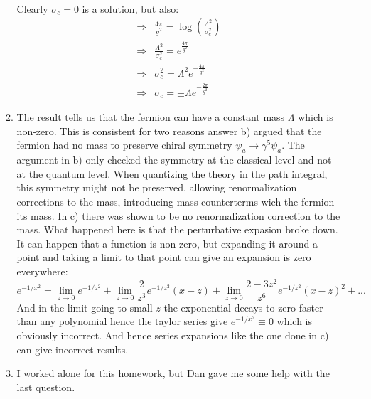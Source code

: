 \documentclass[12pt,a4]{article}
\begin{document}
\begin{enumerate}
\begin{enumerate}
\begin{align*}
        \end{align*}
        Clearly $\sigma_c = 0$ is a solution, but also:
        \begin{align*}
          \Rightarrow & \frac{4 \pi}{g^2} = \log\left(\frac{\Lambda^2}{\sigma^2_c}\right)\\
          \Rightarrow & \frac{\Lambda^2}{\sigma^2_c} = e^{\frac{4 \pi}{g^2}}\\
          \Rightarrow & \sigma^2_c = \Lambda^2 e^{- \frac{4 \pi}{g^2}}\\
          \Rightarrow & \sigma_c = \pm \Lambda e^{- \frac{2 \pi}{g^2}}
        \end{align*}
      \item
        The result tells us that the fermion can have a constant mass $\Lambda$ which is non-zero.
        This is consistent for two reasons answer b) argued that the fermion had no mass to preserve chiral symmetry $\psi_a \to \gamma^5\psi_a$.
        The argument in b) only checked the symmetry at the classical level and not at the quantum level.
        When quantizing the theory in the path integral, this symmetry might not be preserved, allowing renormalization corrections to the mass, introducing mass counterterms wich the fermion its mass.
        In c) there was shown to be no renormalization correction to the mass.
        What happened here is that the perturbative expasion broke down.
        It can happen that a function is non-zero, but expanding it around a point and taking a limit to that point can give an expansion is zero everywhere:
        \begin{equation*}
          e^{-1 / x^2} = \lim_{z \to 0} e^{-1 / z^2} + \lim_{z \to 0} \frac{2}{z^3} e^{-1 / z^2} (x - z) + \lim_{z \to 0} \frac{2 - 3z^2}{z^6} e^{-1 / z^2} (x - z)^2 + ...
        \end{equation*}
        And in the limit going to small $z$ the exponential decays to zero faster than any polynomial hence the taylor series give $e^{-1 / x^2} \equiv 0$ which is obviously incorrect.
        And hence series expansions like the one done in c) can give incorrect results.
      \item
        I worked alone for this homework, but Dan gave me some help with the last question.
    \end{enumerate}
\end{enumerate}
\end{document}
